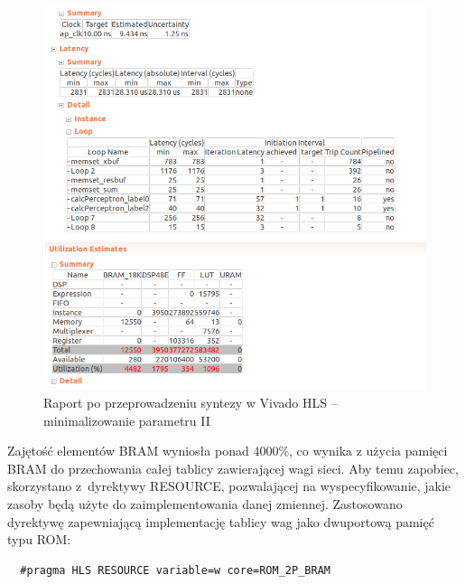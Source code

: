 \begin{figure}[!h]
  \centering
  \includegraphics[width=\textwidth]{img/hls-report3.png}
  \caption{Raport po przeprowadzeniu syntezy w Vivado HLS -- minimalizowanie parametru II}
  \label{hls-report3}
\end{figure}

Zajętość elementów BRAM wyniosła ponad 4000\%, co wynika z użycia pamięci BRAM do przechowania całej tablicy zawierającej wagi sieci. Aby temu zapobiec, skorzystano z~dyrektywy RESOURCE, pozwalającej na wyspecyfikowanie, jakie zasoby będą użyte do zaimplementowania danej zmiennej. Zastosowano dyrektywę zapewniającą implementację tablicy wag jako dwuportową pamięć typu ROM:
\begin{verbatim}
  #pragma HLS RESOURCE variable=w core=ROM_2P_BRAM
\end{verbatim}



